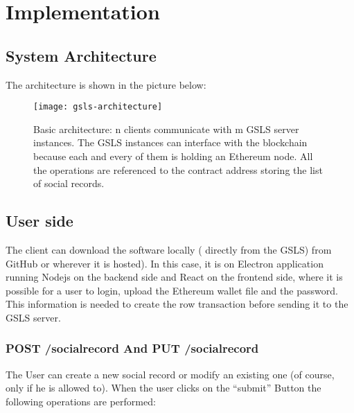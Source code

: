 \chapter{Implementation}
\label{implementation}

\section{System Architecture}
The architecture is shown in the picture below: \\

\begin{figure}[h]
	\centering
  \texttt{[image: gsls-architecture]}
	\caption{Basic architecture: n clients communicate with m GSLS server instances. The GSLS instances can interface with the blockchain because each and every of them is holding an Ethereum node. All the operations are referenced to the contract address storing the list of social records.}
	\label{fig4}
\end{figure}

\section{User side}
The client can download the software locally ( directly from the GSLS) from GitHub or wherever it is hosted).
In this case, it is on Electron application running Nodejs on the backend side and React on the frontend side, where it is possible for a user to login, upload the Ethereum wallet file and the password.
This information is needed to create the row transaction before sending it to the GSLS server.

\subsection{POST /socialrecord And PUT /socialrecord}
The User can create a new social record or modify an existing one (of course, only if he is allowed to).
When the user clicks on the “submit” Button the following operations are performed:

